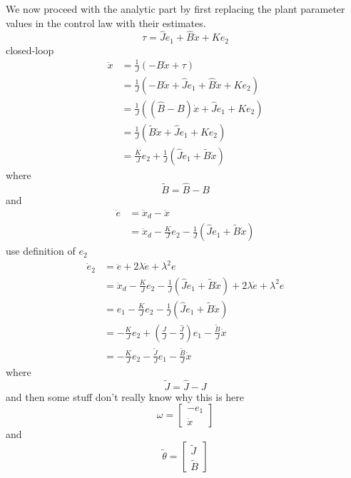 We now proceed with the analytic part by first replacing the plant parameter values in the control law with their estimates.
\begin{equation*}
  \tau=\hat{J}e_{1}+\hat{B}\dot{x}+Ke_{2}
\end{equation*}
closed-loop
\begin{align*}
  \ddot{x}&=\frac{1}{J}(-B\dot{x}+\tau) \\
  &=\frac{1}{J}(-B\dot{x}+\hat{J}e_{1}+\hat{B}\dot{x}+Ke_{2}) \\
  &=\frac{1}{J}((\hat{B}-B)\dot{x}+\hat{J}e_{1}+Ke_{2}) \\
  &=\frac{1}{J}(\tilde{B}\dot{x}+\hat{J}e_{1}+Ke_{2}) \\
  &=\frac{K}{J}e_{2}+\frac{1}{J}\left(\hat{J}e_{1}+\tilde{B}\dot{x}\right)
\end{align*}
where
\begin{equation*}
  \tilde{B}=\hat{B}-B
\end{equation*}
and
\begin{align*}
  \ddot{e}&=\ddot{x}_{d}-\ddot{x} \\
  &=\ddot{x}_{d}-\frac{K}{J}e_{2}-\frac{1}{J}\left(\hat{J}e_{1}+\tilde{B}\dot{x}\right)
\end{align*}
use definition of $e_{2}$
\begin{align*}
  \dot{e}_{2}&=\ddot{e}+2\lambda\dot{e}+\lambda^{2}e \\
  &= \ddot{x}_{d}-\frac{K}{J}e_{2}-\frac{1}{J}\left(\hat{J}e_{1}+\tilde{B}\dot{x}\right)+2\lambda\dot{e}+\lambda^{2}e \\
  &=e_{1}-\frac{K}{J}e_{2}-\frac{1}{J}\left(\hat{J}e_{1}+\tilde{B}\dot{x}\right) \\
  &=-\frac{K}{J}e_{2}+\left(\frac{J}{J}-\frac{\hat{J}}{J}\right)e_{1}-\frac{\tilde{B}}{J}\dot{x} \\
  &=-\frac{K}{J}e_{2}-\frac{\tilde{J}}{J}e_{1}-\frac{\tilde{B}}{J}\dot{x}
\end{align*}
where
\begin{equation*}
  \tilde{J}=\hat{J}-J
\end{equation*}
and then some stuff don't really know why this is here
\begin{equation*}
  \omega=\begin{bmatrix} -e_{1} \\ \dot{x} \end{bmatrix}
\end{equation*}
and
\begin{equation*}
  \tilde{\theta}=\begin{bmatrix} \tilde{J} \\ \tilde{B} \end{bmatrix}
\end{equation*}
